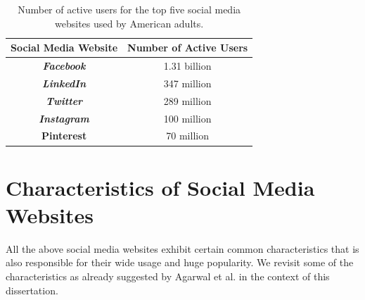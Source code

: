 \begin{table}[h]
\centering
\caption{Number of active users for the top five social media websites used by American adults.}
\label{socialmediastat}
\begin{tabular}{|c|c|}
\hline
\textbf{Social Media Website} & \textbf{Number of Active Users} \\ \hline
\textbf{\textit{Facebook}} & 1.31 billion \\ \hline
\textbf{\textit{LinkedIn}} &  347 million \\ \hline
\textbf{\textit{Twitter}} & 289 million \\ \hline
\textbf{\textit{Instagram}} & 100 million \\ \hline
\textbf{Pinterest} & 70 million \\ \hline
\end{tabular}
\end{table}

\section{Characteristics of Social Media Websites\label{char}}
All the above social media websites exhibit certain common characteristics that is also responsible for their wide usage and huge popularity. We revisit some of the characteristics as already suggested by Agarwal et al. \cite{agarwal2010information} in the context of this dissertation.

